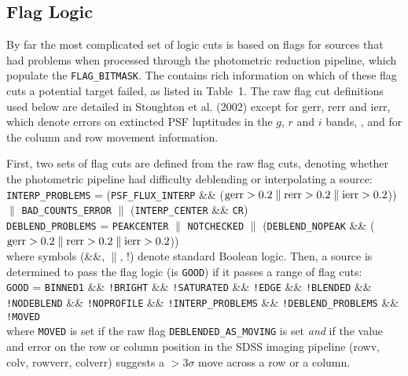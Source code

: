 \documentclass{emulateapj}
\begin{document}
\subsection{Flag Logic}
	By far the most complicated set of logic cuts is based on flags for sources that had problems when processed through the photometric reduction pipeline, which populate the {\tt FLAG\_BITMASK}. The \fb contains rich information on which of these flag cuts a potential target failed, as listed in Table~1. The raw flag cut definitions used below are detailed in Stoughton et al. (2002) except for gerr, rerr and ierr, which denote errors on extincted PSF luptitudes in the $g$, $r$ and $i$ bands, , and for the column and row movement information.
	
	First, two sets of flag cuts are defined from the raw flag cuts, denoting whether the photometric pipeline had difficulty deblending or interpolating a source:\\

	\noindent
    {\tt INTERP\_PROBLEMS} = ({\tt PSF\_FLUX\_INTERP} \&\& ($ {\rm gerr}>0.2 \parallel {\rm rerr} >0.2 \parallel {\rm ierr}>0.2$)) $\parallel$ {\tt BAD\_COUNTS\_ERROR} $\parallel$ ({\tt INTERP\_CENTER} \&\& {\tt CR}) \\
        
    \noindent
    {\tt DEBLEND\_PROBLEMS} = {\tt PEAKCENTER} $\parallel$ {\tt NOTCHECKED} $\parallel$ ({\tt DEBLEND\_NOPEAK} \&\& (${\rm gerr}>0.2 \parallel {\rm rerr}>0.2 \parallel {\rm ierr}>0.2$))\\
        
        \noindent where symbols (\&\&, $\parallel$, !) denote standard Boolean logic. Then, a source is determined to pass the flag logic (is {\tt GOOD}) if it passes a range of flag cuts: \\
                
    \noindent
    {\tt GOOD} = {\tt BINNED1} \&\& {\tt !BRIGHT} \&\& {\tt !SATURATED} \&\& {\tt !EDGE} \&\& {\tt !BLENDED} \&\& {\tt !NODEBLEND} \&\& {\tt !NOPROFILE} \&\& {\tt !INTERP\_PROBLEMS} \&\& {\tt !DEBLEND\_PROBLEMS} \&\& {\tt !MOVED} \\
        
  \noindent  where {\tt MOVED} is set if the raw flag {\tt DEBLENDED\_AS\_MOVING} is set {\em and} if the value and error on the row or column position in the SDSS imaging pipeline (rowv, colv, rowverr, colverr) suggests a $> 3\sigma$ move across a row or a column.
\end{document}
